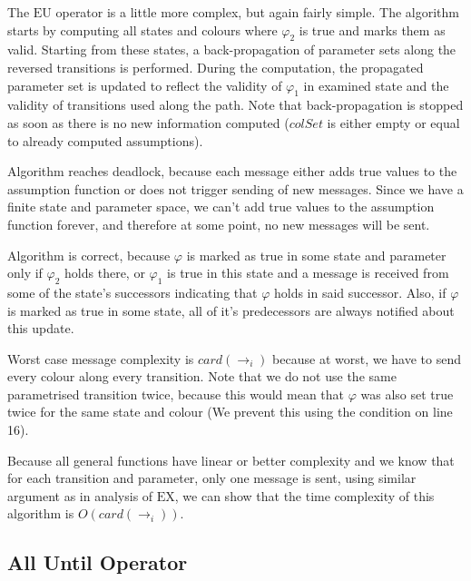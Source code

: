\documentclass[12pt,oneside]{fithesis2}
\newcommand{\trans}[1]{\stackrel{#1}{\rightarrow}}
\newcommand{\eu}[2]{\ensuremath{\mbox{E} #1 \mbox{U} #2 }}
\newcommand{\ex}[1]{\ensuremath{\mbox{EX} #1}}
\begin{document}
				The \eu{}{} operator is a little more complex, but again fairly simple. The algorithm starts by computing all states and colours where $\varphi_2$ is true and marks them as valid. Starting from these states, a back-propagation of parameter sets along the reversed transitions is performed. During the computation, the propagated parameter set is updated to reflect the validity of $\varphi_1$ in examined state and the validity of transitions used along the path. Note that back-propagation is stopped as soon as there is no new information computed ($colSet$ is either empty or equal to already computed assumptions).
				
				Algorithm reaches deadlock, because each message either adds true values to the assumption function or does not trigger sending of new messages. Since we have a finite state and parameter space, we can't add true values to the assumption function forever, and therefore at some point, no new messages will be sent.
				
				Algorithm is correct, because $\varphi$ is marked as true in some state and parameter only if $\varphi_2$ holds there, or $\varphi_1$ is true in this state and a message is received from some of the state's successors indicating that $\varphi$ holds in said successor. Also, if $\varphi$ is marked as true in some state, all of it's predecessors are always notified about this update. 
				
				Worst case message complexity is $card(\trans{}_{i})$ because at worst, we have to send every colour along every transition.	Note that we do not use the same parametrised transition twice, because this would mean that $\varphi$ was also set true twice for the same state and colour (We prevent this using the condition on line 16).
				
				Because all general functions have linear or better complexity and we know that for each transition and parameter, only one message is sent, using similar argument as in analysis of $\ex{}$, we can show that the time complexity of this algorithm is $O(card(\trans{}_{i}))$. 
			
		    \subsection{All Until Operator}
		    
\end{document}
